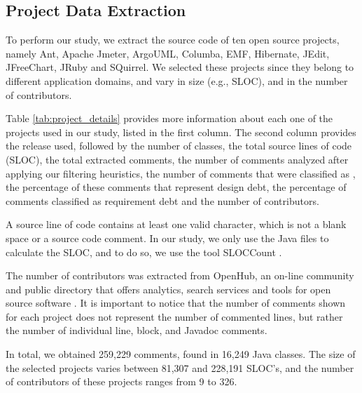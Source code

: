 \subsection{Project Data Extraction} %
\label{sub:data_extraction}

To perform our study, we extract the source code of ten open source projects, namely Ant, Apache Jmeter, ArgoUML, Columba, EMF, Hibernate, JEdit, JFreeChart, JRuby and SQuirrel. We selected these projects since they belong to different application domains, and vary in size (e.g., SLOC), and in the number of contributors. 

Table \ref{tab:project_details} provides more information about each one of the projects used in our study, listed in the first column. The second column provides the release used, followed by the number of classes, the total source lines of code (SLOC), the total extracted comments, the number of comments analyzed after applying our filtering heuristics, the number of comments that were classified as \SATD, the percentage of these comments that represent design debt, the percentage of \SATD comments classified as requirement debt and the number of contributors. 

A source line of code contains at least one valid character, which is not a blank space or a source code comment. In our study, we only use the Java files to calculate the SLOC, and to do so, we use the tool SLOCCount \cite{wheeler2004:home}. 

The number of contributors was extracted from OpenHub, an on-line community and public directory that offers analytics, search services and tools for open source software \cite{Openhub:home}. It is important to notice that the number of comments shown for each project does not represent the number of commented lines, but rather the number of individual line, block, and Javadoc comments. 

In total, we obtained 259,229 comments, found in 16,249 Java classes. The size of the selected projects varies between 81,307 and 228,191 SLOC's, and the number of contributors of these projects ranges from 9 to 326. 


